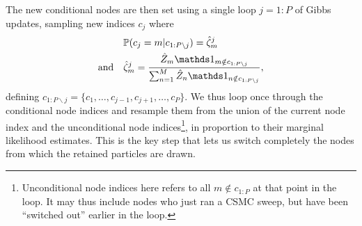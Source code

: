 The new conditional nodes are then set using a single loop $j=1:P$ of Gibbs updates, sampling new indices $c_j$ where
\begin{align}
\label{eq:simConditional}
&\Prb(c_j = m|c_{1:P\backslash j}) = \hat\nz_{m}^j \\
\label{eq:zeta_def}
\mathrm{and}  \quad &{\hat\nz_{m}^j = \frac{\hat Z_{m} \iden_{m \notin c_{1:P \backslash j}}}{ \sum_{n=1}^M \hat Z_{n} \iden_{n \notin c_{1:P \backslash j}}}},
\end{align}
defining ${c_{1:P\backslash j} = \{c_1,\ldots,c_{j-1},c_{j+1},\ldots,c_P\}}$.  We thus loop once through the conditional node indices and resample them from the union of the current node index and the unconditional node indices\footnote{Unconditional node indices here refers to all $m \notin c_{1:P}$ at that point in the loop. It may thus include nodes who just ran a CSMC sweep, but have been ``switched out'' earlier in the loop.}, in proportion to their marginal likelihood estimates.  This is the key step that lets us switch completely the nodes from which the retained particles are drawn.



%

